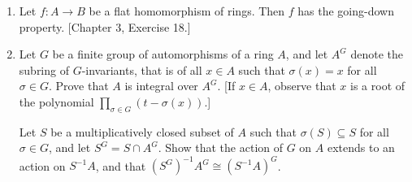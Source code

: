\begin{enumerate}
\begin{enumerate}
(a) $f^*$ is a closed mapping.

(b) $f$ has the going-up property.

(c) Let $\mathfrak q$ be any prime ideal of $B$ and let $\mathfrak p=\mathfrak q^c$. Then $f^*:\operatorname{Spec}(B/\mathfrak q)\longrightarrow\operatorname{Spec}(A/\mathfrak p)$ is surjective.

Prove that (a) $\Rightarrow$ (b) $\Longleftrightarrow$ (c). (See also Chapter 6, Exercise 11.)

\item Consider the following three statements:

(a') $f^*$ is an open mapping.

(b') $f$ has the going-down property.

(c') For any prime ideal $\mathfrak q$ of $B$, if $\mathfrak p=\mathfrak q^c$, then $f^*:\operatorname{Spec}(B_{\mathfrak q})\longrightarrow\operatorname{Spec}(A_{\mathfrak p})$ is surjective.

Prove that (a') $\Rightarrow$ (b') $\Longleftrightarrow$ (c'). (See also Chapter 7, Exercise 23.)
\end{enumerate}
[To prove that (a') $\Rightarrow$ (c'), observe that $B_{\mathfrak q}$ is the direct limit of the rings $B_t$ where $t\in B-\mathfrak q$; hence, by Chapter 3, Exercise 26, we have $f^*(\operatorname{Spec}(B_{\mathfrak q}))=\bigcap_t f^*(\operatorname{Spec}(B_t))=\bigcap_t f^*(Y_t)$. Since $Y_t$ is an open neighborhood of $\mathfrak q$ in $Y$, and since $f^*$ is open, it follows that $f^*(Y_t)$ is an open neighborhood of $\mathfrak p$ in $X$ and therefore contains $\operatorname{Spec}(A_{\mathfrak p})$.]

\item Let $f:A\longrightarrow B$ be a flat homomorphism of rings. Then $f$ has the going-down property. [Chapter 3, Exercise 18.]

\item Let $G$ be a finite group of automorphisms of a ring $A$, and let $A^G$ denote the subring of $G$-invariants, that is of all $x\in A$ such that $\sigma(x)=x$ for all $\sigma\in G$. Prove that $A$ is integral over $A^G$. [If $x\in A$, observe that $x$ is a root of the polynomial $\prod_{\sigma\in G}(t-\sigma(x))$.]

Let $S$ be a multiplicatively closed subset of $A$ such that $\sigma(S)\subseteq S$ for all $\sigma\in G$, and let $S^G=S\cap A^G$. Show that the action of $G$ on $A$ extends to an action on $S^{-1}A$, and that $(S^G)^{-1}A^G\cong(S^{-1}A)^G$.


\end{enumerate}
